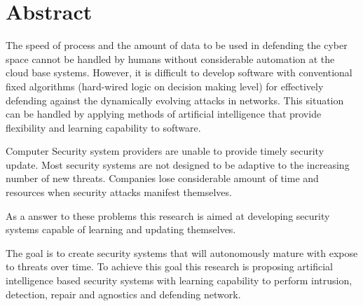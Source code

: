 \chapter*{Abstract} 

The speed of process and the amount of data to be used in defending the cyber space cannot be handled by humans without considerable automation at the cloud base systems.
However, it is difficult to develop software with conventional fixed algorithms (hard-wired logic on decision making level)
for effectively defending against the dynamically evolving attacks in networks. This situation can be handled by applying methods of artificial intelligence that provide flexibility
and learning capability to software.

Computer Security system providers are unable to provide timely security update. Most security systems are not designed to be adaptive to 
the increasing number of new threats. Companies lose considerable amount of time and resources when security attacks manifest themselves. 

As a answer to these problems this research is aimed at developing security systems capable of learning and updating themselves.

The goal is to create security systems that will autonomously mature with expose to threats over time.
To achieve this goal this research is proposing artificial intelligence based security systems with learning capability 
to perform intrusion, detection, repair and agnostics and defending network.


